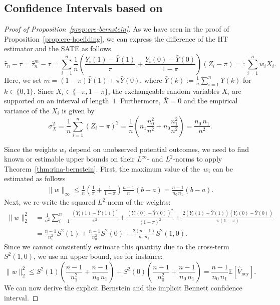 \documentclass[aos]{imsart2}
\theoremstyle{plain}
\theoremstyle{definition}
\newcommand{\E}{\mathbb{E}}
\newcommand{\xb}{\bar{X}}
\newcommand{\yb}{\bar{Y}}
\newcommand{\vhn}{\hat{V}_{\mathrm{ney}}}
\newcommand{\tauh}{\hat{\tau}}
\begin{document}
\begin{appendix}
\subsection{Confidence Intervals based on \cite{barber_hoeffding_2024}}\label{app:cre-bernstein-barber}
\begin{proof}[Proof of Proposition~\ref{prop:cre-bernstein}]
As we have seen in the proof of Proposition~\ref{prop:cre-hoeffding}, we can express the difference of the HT estimator and the SATE as follows
\begin{equation*}
    \tauh_n-\tau = \tauh_n^m-\tau = \sum_{i=1}^n\frac{1}{n} \left(\frac{Y_i(1)-\yb(1)}{\pi}+\frac{Y_i(0)-\yb(0)}{1-\pi}\right)(Z_i-\pi)=:\sum_{i=1}^n w_i X_i.
\end{equation*}
Here, we set $m=(1-\pi)\yb(1)+\pi \yb(0)$,
where $\yb(k):=\frac{1}{n}\sum_{i=1}^n Y(k)$ for $k\in \{0,1\}$. Since $X_i \in \{-\pi,1-\pi\}$, the exchangeable random variables $X_i$ are supported on an interval of length~$1$. Furthermore, $\xb = 0$ and the empirical variance of the $X_i$ is given by
\begin{equation*}
    \sigma_X^2 = \frac{1}{n}\sum_{i=1}^n (Z_i-\pi)^2 = \frac{1}{n} \left(n_1 \frac{n_0^2}{n^2}+n_0\frac{n_1^2}{n^2}\right) = \frac{n_0\,n_1}{n^2}.
\end{equation*}

Since the weights $w_i$ depend on unobserved potential outcomes, we need to find known or estimable upper bounds on their $L^\infty$- and $L^2$-norms to apply Theorem~\ref{thm:rina-bernstein}. First, the maximum value of the~$w_i$ can be estimated as follows
\begin{align*}
    \lVert w \rVert_\infty \leq \frac{1}{n}\left(\frac{1}{\pi}+\frac{1}{1-\pi}\right) \frac{n-1}{n} (b-a) = \frac{n-1}{n_0\,n_1}(b-a).
\end{align*}
Next, we re-write the squared $L^2$-norm of the weights:
\begin{align*}
    \lVert w \rVert_2^2 &= \frac{1}{n^2} \sum_{i=1}^n \frac{(Y_i(1)-\yb(1))^2}{\pi^2} + \frac{(Y_i(0)-\yb(0))^2}{(1-\pi)^2} + \frac{2(Y_i(1)-\yb(1))(Y_i(0)-\yb(0))}{\pi(1-\pi)}\\
    &= \frac{n-1}{n_1^2}S^2(1)+\frac{n-1}{n_0^2}S^2(0)+\frac{2(n-1)}{n_0\,n_1}S^2(1,0).
\end{align*}
Since we cannot consistently estimate this quantity due to the cross-term $S^2(1,0)$, we use an upper bound, see \cite[Lem.~4.1]{ding_first_2024} for instance:
\begin{equation*}
    \lVert w \rVert_2^2 \leq S^2(1)\left(\frac{n-1}{n_1^2}+\frac{n-1}{n_0\,n_1}\right) + S^2(0)\left(\frac{n-1}{n_0^2}+\frac{n-1}{n_0\,n_1}\right) = \frac{n-1}{n_0\,n_1} \E[\vhn].
\end{equation*}
We can now derive the explicit Bernstein and the implicit Bennett confidence interval.


\end{proof}
\end{appendix}
\end{document}
